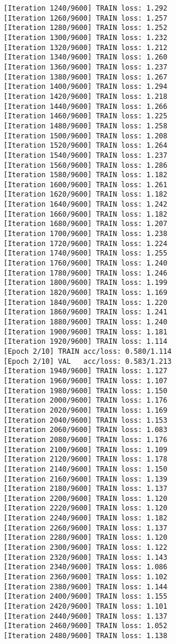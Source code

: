 \documentclass[11pt]{article}
\begin{document}
\begin{Verbatim}[commandchars=\\\{\}]
[Iteration 1240/9600] TRAIN loss: 1.292
[Iteration 1260/9600] TRAIN loss: 1.257
[Iteration 1280/9600] TRAIN loss: 1.252
[Iteration 1300/9600] TRAIN loss: 1.232
[Iteration 1320/9600] TRAIN loss: 1.212
[Iteration 1340/9600] TRAIN loss: 1.260
[Iteration 1360/9600] TRAIN loss: 1.237
[Iteration 1380/9600] TRAIN loss: 1.267
[Iteration 1400/9600] TRAIN loss: 1.294
[Iteration 1420/9600] TRAIN loss: 1.218
[Iteration 1440/9600] TRAIN loss: 1.266
[Iteration 1460/9600] TRAIN loss: 1.225
[Iteration 1480/9600] TRAIN loss: 1.258
[Iteration 1500/9600] TRAIN loss: 1.208
[Iteration 1520/9600] TRAIN loss: 1.264
[Iteration 1540/9600] TRAIN loss: 1.237
[Iteration 1560/9600] TRAIN loss: 1.286
[Iteration 1580/9600] TRAIN loss: 1.182
[Iteration 1600/9600] TRAIN loss: 1.261
[Iteration 1620/9600] TRAIN loss: 1.182
[Iteration 1640/9600] TRAIN loss: 1.242
[Iteration 1660/9600] TRAIN loss: 1.182
[Iteration 1680/9600] TRAIN loss: 1.207
[Iteration 1700/9600] TRAIN loss: 1.238
[Iteration 1720/9600] TRAIN loss: 1.224
[Iteration 1740/9600] TRAIN loss: 1.255
[Iteration 1760/9600] TRAIN loss: 1.240
[Iteration 1780/9600] TRAIN loss: 1.246
[Iteration 1800/9600] TRAIN loss: 1.199
[Iteration 1820/9600] TRAIN loss: 1.169
[Iteration 1840/9600] TRAIN loss: 1.220
[Iteration 1860/9600] TRAIN loss: 1.241
[Iteration 1880/9600] TRAIN loss: 1.240
[Iteration 1900/9600] TRAIN loss: 1.181
[Iteration 1920/9600] TRAIN loss: 1.114
[Epoch 2/10] TRAIN acc/loss: 0.580/1.114
[Epoch 2/10] VAL   acc/loss: 0.583/1.213
[Iteration 1940/9600] TRAIN loss: 1.127
[Iteration 1960/9600] TRAIN loss: 1.107
[Iteration 1980/9600] TRAIN loss: 1.150
[Iteration 2000/9600] TRAIN loss: 1.176
[Iteration 2020/9600] TRAIN loss: 1.169
[Iteration 2040/9600] TRAIN loss: 1.153
[Iteration 2060/9600] TRAIN loss: 1.083
[Iteration 2080/9600] TRAIN loss: 1.176
[Iteration 2100/9600] TRAIN loss: 1.109
[Iteration 2120/9600] TRAIN loss: 1.178
[Iteration 2140/9600] TRAIN loss: 1.150
[Iteration 2160/9600] TRAIN loss: 1.139
[Iteration 2180/9600] TRAIN loss: 1.137
[Iteration 2200/9600] TRAIN loss: 1.120
[Iteration 2220/9600] TRAIN loss: 1.120
[Iteration 2240/9600] TRAIN loss: 1.182
[Iteration 2260/9600] TRAIN loss: 1.137
[Iteration 2280/9600] TRAIN loss: 1.120
[Iteration 2300/9600] TRAIN loss: 1.122
[Iteration 2320/9600] TRAIN loss: 1.143
[Iteration 2340/9600] TRAIN loss: 1.086
[Iteration 2360/9600] TRAIN loss: 1.102
[Iteration 2380/9600] TRAIN loss: 1.144
[Iteration 2400/9600] TRAIN loss: 1.155
[Iteration 2420/9600] TRAIN loss: 1.101
[Iteration 2440/9600] TRAIN loss: 1.137
[Iteration 2460/9600] TRAIN loss: 1.052
[Iteration 2480/9600] TRAIN loss: 1.138

\end{Verbatim}
\end{document}
